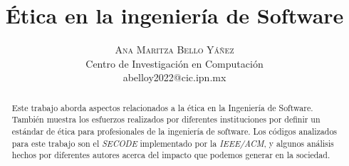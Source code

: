 \documentclass[twoside]{article}
\title{\vspace{-15mm}\fontsize{24pt}{10pt}\selectfont\textbf{Ética en la
ingeniería de Software}}
\author{
\large
\textsc{Ana Maritza Bello Yáñez} \\
\normalsize Centro de Investigación en Computación \\ 
\normalsize {abelloy2022@cic.ipn.mx}
\vspace{-5mm}
}
\date{}
\begin{document}
\maketitle %

\thispagestyle{fancy} %


\begin{abstract}

\noindent Este trabajo aborda aspectos relacionados a la ética en la Ingeniería
de Software. También muestra los esfuerzos realizados por diferentes
instituciones por definir un estándar de ética para profesionales de la
ingeniería de software. Los códigos analizados para este trabajo son el
\textit{SECODE} implementado por la \textit{IEEE/ACM}, y algunos análisis hechos
por diferentes autores acerca del impacto que podemos generar en la sociedad.

\end{abstract}

\end{document}
